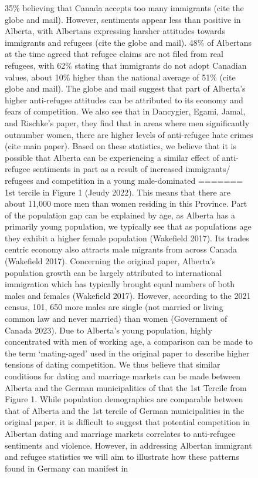 \documentclass[
]{article}
\begin{document}
\begin{figure}
35\% believing that Canada accepts too many immigrants (cite the globe
and mail). However, sentiments appear less than positive in Alberta,
with Albertans expressing harsher attitudes towards immigrants and
refugees (cite the globe and mail). 48\% of Albertans at the time agreed
that refugee claims are not filed from real refugees, with 62\% stating
that immigrants do not adopt Canadian values, about 10\% higher than the
national average of 51\% (cite globe and mail). The globe and mail
suggest that part of Alberta's higher anti-refugee attitudes can be
attributed to its economy and fears of competition. We also see that in
Dancygier, Egami, Jamal, and Rischke's paper, they find that in areas
where men significantly outnumber women, there are higher levels of
anti-refugee hate crimes (cite main paper). Based on these statistics,
we believe that it is possible that Alberta can be experiencing a
similar effect of anti-refugee sentiments in part as a result of
increased immigrants/ refugees and competition in a young male-dominated
=======
1st tercile in Figure 1 (Jeudy 2022). This means that there are about
11,000 more men than women residing in this Province. Part of the
population gap can be explained by age, as Alberta has a primarily young
population, we typically see that as populations age they exhibit a
higher female population (Wakefield 2017). Its trades centric economy
also attracts male migrants from across Canada (Wakefield 2017).
Concerning the original paper, Alberta's population growth can be
largely attributed to international immigration which has typically
brought equal numbers of both males and females (Wakefield 2017).
However, according to the 2021 census, 101, 650 more males are single
(not married or living common law and never married) than women
(Government of Canada 2023). Due to Alberta's young population, highly
concentrated with men of working age, a comparison can be made to the
term `mating-aged' used in the original paper to describe higher
tensions of dating competition. We thus believe that similar conditions
for dating and marriage markets can be made between Alberta and the
German municipalities of that the 1st Tercile from Figure 1. While
population demographics are comparable between that of Alberta and the
1st tercile of German municipalities in the original paper, it is
difficult to suggest that potential competition in Albertan dating and
marriage markets correlates to anti-refugee sentiments and violence.
However, in addressing Albertan immigrant and refugee statistics we will
aim to illustrate how these patterns found in Germany can manifest in

\end{figure}
\end{document}
